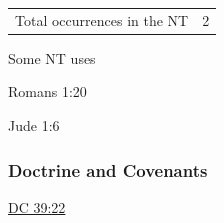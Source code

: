 				\begin{tabular}{ll}
					Total occurrences in the NT & 2
				\end{tabular}
				
				\begin{compactdesc}
					\item[Some NT uses] \textbf{}
						\begin{compactdesc}
							\item[Romans 1:20]
							\item[Jude 1:6] 
						\end{compactdesc}
				\end{compactdesc}
		
	
		
		
	\subsubsection{Doctrine and Covenants} %
		\label{ETERNITY-DC}
	
		
		\begin{compactdesc}
			\item[{\hyperref[DC39-22]{DC 39:22}}]
		\end{compactdesc}
		
	
		
